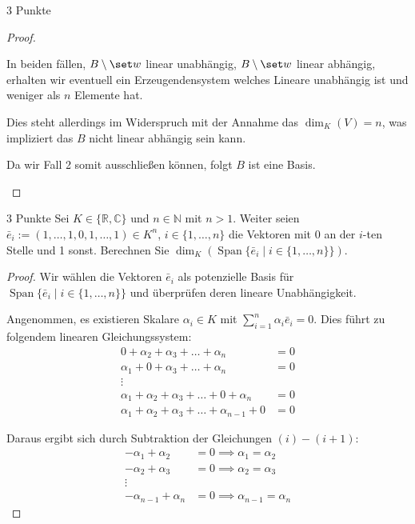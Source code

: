 \documentclass{problemset}
\begin{document}
\begin{problem}{3 Punkte}
\begin{proof}
\begin{itemize}
\begin{itemize}
			            In beiden fällen, $B \setminus \set w$ linear unabhängig, $B \setminus \set w$ linear abhängig,
			            erhalten wir eventuell ein Erzeugendensystem welches Lineare unabhängig ist und weniger als $n$ Elemente hat.

			            Dies steht allerdings im Widerspruch mit der Annahme das $\dim_K(V) = n$, was impliziert das $B$ nicht linear abhängig sein kann.
		      \end{itemize}

		      Da wir Fall 2 somit ausschließen können, folgt $B$ ist eine Basis. \checkmark
	\end{itemize}
\end{proof}
\end{problem}

\begin{problem}{3 Punkte}
Sei $K \in \{ \mathbb{R}, \mathbb{C} \}$ und $n \in \mathbb{N}$ mit $n > 1$. Weiter seien $\bar{e}_i := (1, \ldots, 1, 0, 1, \ldots, 1) \in K^n$, $i \in \{1, \ldots, n\}$ die Vektoren mit 0 an der $i$-ten Stelle und 1 sonst. Berechnen Sie $\dim_K(\operatorname{Span}\{\bar{e}_i \mid i \in \{1, \ldots, n\}\})$.

\begin{proof}
	Wir wählen die Vektoren $\bar{e}_i$ als potenzielle Basis für $\operatorname{Span}\{\bar{e}_i \mid i \in \{1, \ldots, n\}\}$ und überprüfen deren lineare Unabhängigkeit.

	Angenommen, es existieren Skalare $\alpha_i \in K$ mit $\sum_{i=1}^{n} \alpha_i \bar{e}_i = 0$. Dies führt zu folgendem linearen Gleichungssystem:
	\begin{align}
		0 + \alpha_2 + \alpha_3 + \ldots + \alpha_n                & = 0             \\
		\alpha_1 + 0 + \alpha_3 + \ldots + \alpha_n                & = 0             \\
		\vdots                                                          \tag*{}      \\
		\alpha_1 + \alpha_2 + \alpha_3 + \ldots + 0 + \alpha_n     & = 0 \tag{n - 1} \\
		\alpha_1 + \alpha_2 + \alpha_3 + \ldots + \alpha_{n-1} + 0 & = 0 \tag{n}
	\end{align}

	Daraus ergibt sich durch Subtraktion der Gleichungen $(i)-(i+1)$:
	\begin{align*}
		-\alpha_1 + \alpha_2     & = 0 \implies \alpha_1 = \alpha_2     \\
		-\alpha_2 + \alpha_3     & = 0 \implies \alpha_2 = \alpha_3     \\
		\vdots                                                          \\
		-\alpha_{n-1} + \alpha_n & = 0 \implies \alpha_{n-1} = \alpha_n
	\end{align*}


\end{proof}
\end{problem}
\end{document}
